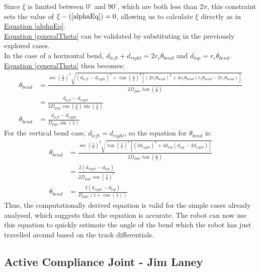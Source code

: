\documentclass[11pt]{article}		%
\begin{document}
		Since $\xi$ is limited between $0^\circ$ and $90^\circ$, which are both less than $2 \pi$, this constraint sets the value of $\xi - (\ref*{alphaEq}) = 0$, allowing us to calculate $\xi$ directly as in \hyperref[alphaEq]{Equation \ref*{alphaEq}}.
		\\
		\hyperref[generalTheta]{Equation \ref*{generalTheta}} can be validated by substituting in the previously explored cases.
		\\
		In the case of a horizontal bend, $d_{left} + d_{right} = 2 r_c \theta_{bend} $ and $d_{top} = r_c \theta_{bend}$.
		\hyperref[generalTheta]{Equation \ref*{generalTheta}} then becomes:
		\begin{align*}
			\theta_{bend} &= \frac{ \sec \left( \frac{\lambda}{2} \right)^2 \sqrt{ \left( d_{left} - d_{right} \right)^2 +  \tan \left( \frac{\lambda}{2} \right)^2 \left[ \left( 2 r_c \theta_{bend} \right)^2 + 4 r_c \theta_{bend} \left( r_c \theta_{bend}  - 2 r_c \theta_{bend} \right) \right] } }{2 D_{pipe} \tan \left( \frac{\lambda}{2} \right)}
			\\
			&= \frac{d_{left} - d_{right}}{2 D_{pipe} \cos \left( \frac{\lambda}{2} \right) \sin \left( \frac{\lambda}{2} \right)}
			\\
			\theta_{bend} &= \frac{d_{left} - d_{right}}{D_{pipe} \sin \left( \lambda \right)}
		\end{align*}
		For the vertical bend case, $d_{left} = d_{right}$, so the equation for $\theta_{bend}$ is:
		\begin{align*}
			\theta_{bend} &= \frac{ \sec \left( \frac{\lambda}{2} \right)^2 \sqrt{ \tan \left( \frac{\lambda}{2} \right)^2 \left[ \left( 2 d_{right} \right)^2 + 4 d_{top} \left( d_{top} - 2 d_{right} \right) \right] } }{2 D_{pipe} \tan \left( \frac{\lambda}{2} \right)}
			\\
			&= \frac{2 \left( d_{right} - d_{top} \right)}{2 D_{pipe} \cos \left( \frac{\lambda}{2} \right)^2}
			\\
			\theta_{bend} &= \frac{2 \left( d_{right} - d_{top} \right)}{D_{pipe} \left( 1 + \cos \left( \lambda \right) \right)}
		\end{align*}
		Thus, the computationally derived equation is valid for the simple cases already analysed, which suggests that the equation is accurate.
		The robot can now use this equation to quickly estimate the angle of the bend which the robot has just travelled around based on the track differentials.
		 		
		\subsection[Active Compliance Joint]{Active Compliance Joint - Jim Laney}
		
\end{document}
